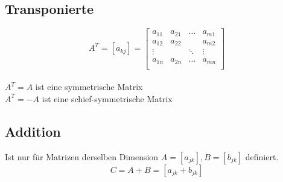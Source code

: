 \subsection*{Transponierte}
\[
	A^T = \left[ a_{kj} \right] =
		\begin{bmatrix}
			a_{11} & a_{21} & \ldots & a_{m1} \\
			a_{12} & a_{22} &  & a_{m2} \\
			\vdots &  & \ddots & \vdots \\
			a_{1n} & a_{2n} & \ldots & a_{mn} \\
		\end{bmatrix}
\]
\\
$A^T = A$ ist eine symmetrische Matrix\\
$A^T = -A$ ist eine schief-symmetrische Matrix

\subsection*{Addition}
Ist nur für Matrizen derselben Dimension $A = [a_{jk}], B=[b_{jk}]$ definiert.
\[
	C = A + B = [a_{jk} + b_{jk}]
\]

